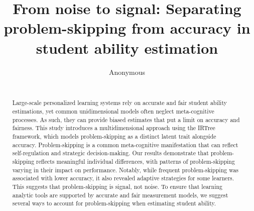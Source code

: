 \documentclass{edm_article}
\begin{document}
 

\title{From noise to signal: Separating problem-skipping from accuracy in student ability estimation}


\author{
Anonymous\\
       \affaddr{}\\
       \email{}
}

\maketitle

\begin{abstract}
Large-scale personalized learning systems rely on accurate and fair student ability estimations, yet common unidimensional models often neglect meta-cognitive processes. As such, they can provide biased estimates that put a limit on accuracy and fairness. This study introduces a multidimensional approach using the IRTree framework, which models problem-skipping as a distinct latent trait alongside accuracy. Problem-skipping is a common meta-cognitive manifestation that can reflect self-regulation and strategic decision-making. Our results demonstrate that problem-skipping reflects meaningful individual differences, with patterns of problem-skipping varying in their impact on performance. Notably, while frequent problem-skipping was associated with lower accuracy, it also revealed adaptive strategies for some learners. This suggests that problem-skipping is signal, not noise. To ensure that learning analytic tools are supported by accurate and fair measurement models, we suggest several ways to account for problem-skipping when estimating student ability.
            
\end{abstract}

\end{document}

